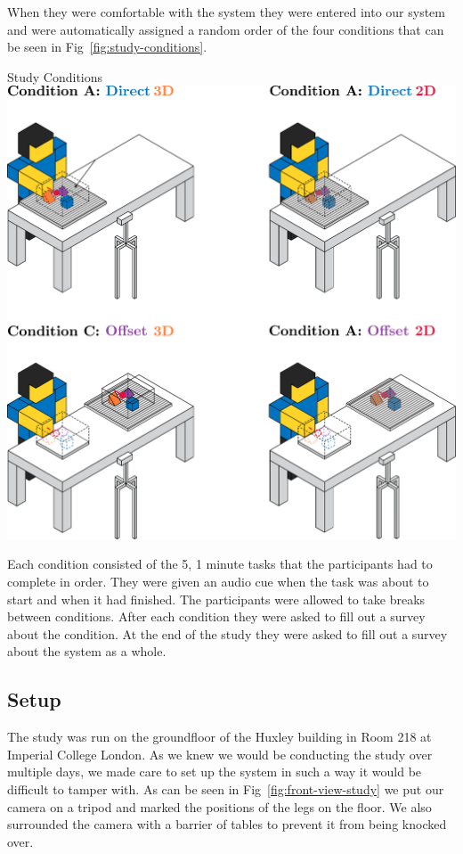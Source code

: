 When they were comfortable with the system they were entered into our system and were automatically assigned a random order of the four conditions that can be seen in Fig~\ref{fig:study-conditions}. 

\begin{figureBox}[label={fig:study-conditions}, width=0.8\linewidth]{Study Conditions}
    \includegraphics[width = 0.8\linewidth]{./implementation/figures/study-conditions.pdf}
\end{figureBox}

Each condition consisted of the 5, 1 minute tasks that the participants had to complete in order. They were given an audio cue when the task was about to start and when it had finished. The participants were allowed to take breaks between conditions. After each condition they were asked to fill out a survey about the condition. At the end of the study they were asked to fill out a survey about the system as a whole. 

\subsection{Setup}

The study was run on the groundfloor of the Huxley building in Room 218 at Imperial College London. As we knew we would be conducting the study over multiple days, we made care to set up the system in such a way it would be difficult to tamper with. As can be seen in Fig~\ref{fig:front-view-study} we put our camera on a tripod and marked the positions of the legs on the floor. We also surrounded the camera with a barrier of tables to prevent it from being knocked over. \\


